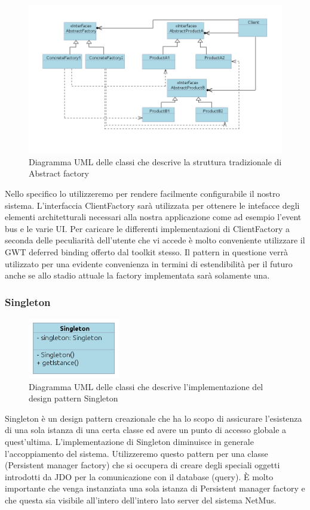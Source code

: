 \begin{figure}[h]
\centering
\includegraphics[width=16.5cm]{img/ST/AbstractFactory.png}
\caption{Diagramma UML delle classi che descrive la struttura tradizionale di
Abstract factory}
\end{figure}
Nello specifico lo utilizzeremo per rendere facilmente configurabile il nostro
sistema. L'interfaccia ClientFactory sar\`a utilizzata per ottenere le
intefacce degli elementi architetturali necessari alla nostra applicazione come
ad esempio l'event bus e le varie UI.
Per caricare le differenti implementazioni di ClientFactory a seconda delle
peculiarit\`a dell'utente che vi accede \`e molto conveniente utilizzare il GWT
deferred binding offerto dal toolkit stesso.
Il pattern in questione verr\`a utilizzato per una evidente convenienza in termini
di estendibilit\`a per il futuro anche se allo stadio attuale la factory
implementata sar\`a solamente una.

\newpage
\subsubsection{Singleton}
\begin{figure}[h]
\centering
\includegraphics[width=4cm]{img/ST/Singleton.png}
\caption{Diagramma UML delle classi che descrive l'implementazione del design
pattern Singleton}
\end{figure}
Singleton \`e un design pattern creazionale che ha lo scopo di assicurare
l'esistenza di una sola istanza di una certa classe ed avere un punto di accesso
globale a quest'ultima. 
L'implementazione di Singleton diminuisce in generale l'accoppiamento del
sistema.
Utilizzeremo questo pattern per una classe (Persistent manager factory) che si
occupera di creare degli speciali oggetti introdotti da JDO per la
comunicazione con il database (query). \`E molto importante che venga instanziata una sola
istanza di Persistent manager factory e che questa sia visibile all'intero
dell'intero lato server del sistema NetMus. 

